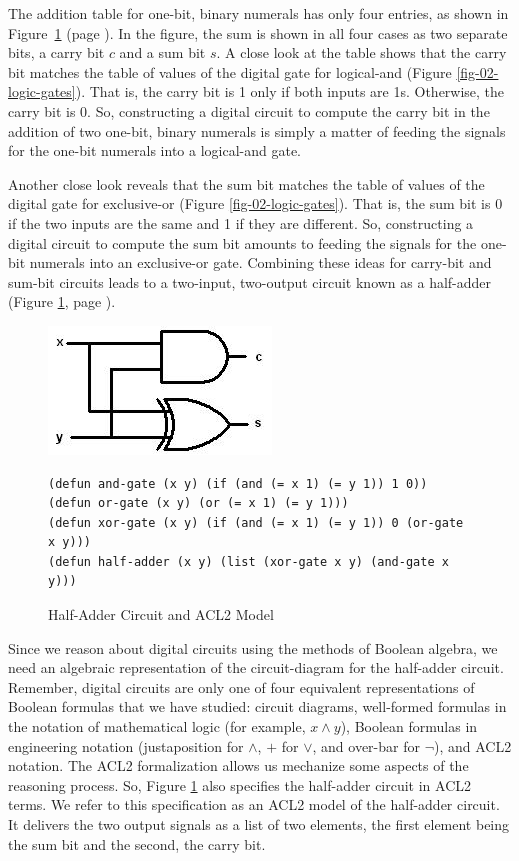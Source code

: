 The addition table for one-bit, binary numerals
has only four entries, as shown in
Figure~\ref{fig:half-adder} (page \pageref{fig:half-adder}).
In the figure, the sum is shown in all four cases as two separate bits,
a carry bit $c$ and a sum bit $s$.
A close look at the table shows that
the carry bit matches the table of values of the
digital gate for logical-and (Figure \ref{fig-02-logic-gates}).
That is, the carry bit is 1 only if both inputs are 1s.
Otherwise, the carry bit is 0.
So, constructing a digital circuit to compute the carry bit
in the addition of two one-bit, binary numerals is simply
a matter of feeding the signals for the one-bit numerals
into a logical-and gate.

Another close look reveals that the sum bit
matches the table of values of the
digital gate for exclusive-or (Figure \ref{fig-02-logic-gates}).
That is, the sum bit is 0 if the two inputs are the same
and 1 if they are different.
So, constructing a digital circuit to compute the sum bit
amounts to feeding the signals for the one-bit numerals
into an exclusive-or gate.
Combining these ideas for carry-bit and sum-bit circuits
leads to a two-input, two-output circuit known as a
half-adder (Figure \ref{fig:half-adder}, page \pageref{fig:half-adder}).

\begin{figure}
\begin{center}
\includegraphics[scale=0.23]{Images/half-adder.png}
\begin{Verbatim}
(defun and-gate (x y) (if (and (= x 1) (= y 1)) 1 0))
(defun or-gate (x y) (or (= x 1) (= y 1)))
(defun xor-gate (x y) (if (and (= x 1) (= y 1)) 0 (or-gate x y)))
(defun half-adder (x y) (list (xor-gate x y) (and-gate x y)))
\end{Verbatim}
\end{center}
\caption{Half-Adder Circuit and ACL2 Model}
\label{fig:half-adder}
\end{figure}

Since we reason about digital circuits using the methods
of Boolean algebra, we need an algebraic representation
of the circuit-diagram for the half-adder circuit.
Remember, digital circuits are only one of four
equivalent representations of Boolean formulas that
we have studied: circuit diagrams, well-formed formulas
in the notation of mathematical logic (for example, $x \wedge y$),
Boolean formulas in engineering notation (justaposition for $\wedge$,
$+$ for $\vee$, and over-bar for $\neg$), and ACL2 notation.
The ACL2 formalization allows us mechanize some aspects of the reasoning process.
So, Figure \ref{fig:half-adder} also specifies the half-adder circuit in ACL2 terms.
We refer to this specification as an
ACL2 model of the half-adder circuit.
It delivers the two output signals as a list of two elements,
the first element being the sum bit and the second, the carry bit.

